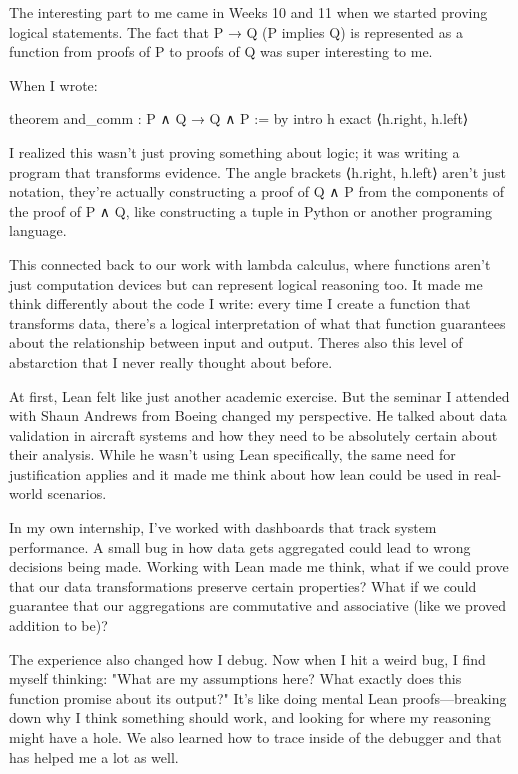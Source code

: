 \documentclass{article}
\theoremstyle{theorem}
\theoremstyle{definition}
\theoremstyle{remark}
\begin{document}
The interesting part to me came in Weeks 10 and 11 when we started proving logical statements.
The fact that P → Q (P implies Q) is represented as a function from proofs of P to proofs of Q was
super interesting to me.

When I wrote:

    theorem and_comm : P ∧ Q → Q ∧ P := by
    intro h
    exact ⟨h.right, h.left⟩

I realized this wasn't just proving something about logic; it was writing a program that transforms
evidence. The angle brackets ⟨h.right, h.left⟩ aren't just notation, they're actually constructing a
proof of Q ∧ P from the components of the proof of P ∧ Q, like constructing a tuple in Python or another
programing language.

This connected back to our work with lambda calculus, where functions aren't just computation devices
but can represent logical reasoning too. It made me think differently about the code I write: every time
I create a function that transforms data, there's a logical interpretation of what that function guarantees
about the relationship between input and output. Theres also this level of abstarction that I never really
thought about before.

At first, Lean felt like just another academic exercise. But the seminar I attended with Shaun Andrews
from Boeing changed my perspective. He talked about data validation in aircraft systems and how they need
to be absolutely certain about their analysis. While he wasn't using Lean specifically, the same need for
justification applies and it made me think about how lean could be used in real-world scenarios.

In my own internship, I've worked with dashboards that track system performance. A small bug in how data gets
aggregated could lead to wrong decisions being made. Working with Lean made me think, what if we could prove
that our data transformations preserve certain properties? What if we could guarantee that our aggregations are
commutative and associative (like we proved addition to be)?

The experience also changed how I debug. Now when I hit a weird bug, I find myself thinking: "What are my assumptions
here? What exactly does this function promise about its output?" It's like doing mental Lean proofs—breaking down
why I think something should work, and looking for where my reasoning might have a hole. We also learned how to trace
inside of the debugger and that has helped me a lot as well.
\end{document}
